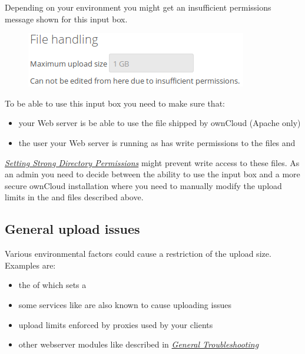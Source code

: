\documentclass[letterpaper,10pt,english]{sphinxmanual}
\begin{document}
Depending on your environment you might get an insufficient permissions message shown for
this input box.
\begin{figure}[htbp]
\centering

\includegraphics{admin_filehandling-2.png}
\end{figure}

To be able to use this input box you need to make sure that:
\begin{itemize}
\item {} 
your Web server is be able to use the  file shipped by ownCloud (Apache only)

\item {} 
the user your Web server is running as has write permissions to the files  and 

\end{itemize}

{\hyperref[installation/installation_wizard:strong-perms-label]{\emph{Setting Strong Directory Permissions}}} might prevent write access to these files. As an admin you need
to decide between the ability to use the input box and a more secure ownCloud installation
where you need to manually modify the upload limits in the  and 
files described above.


\subsection{General upload issues}
\label{configuration_files/big_file_upload_configuration:general-upload-issues}
Various environmental factors could cause a restriction of the upload size. Examples are:
\begin{itemize}
\item {} 
the  of  which sets a 

\item {} 
some services like  are also known to cause uploading issues

\item {} 
upload limits enforced by proxies used by your clients

\item {} 
other webserver modules like described in {\hyperref[issues/general_troubleshooting::doc]{\emph{General Troubleshooting}}}

\end{itemize}
\end{document}
